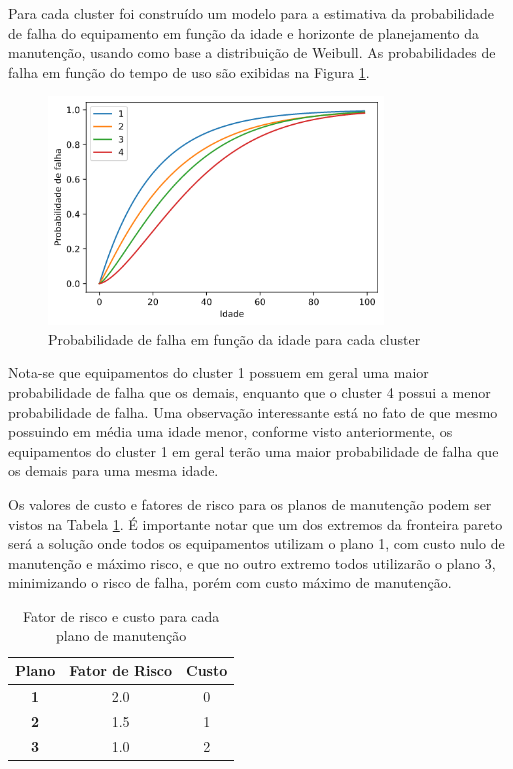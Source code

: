 \documentclass[conference]{IEEEtran}
\begin{document}
Para cada cluster foi construído um modelo para a estimativa da probabilidade de falha do equipamento em função da idade e horizonte de planejamento da manutenção, usando como base a distribuição de Weibull. As probabilidades de falha em função do tempo de uso são exibidas na Figura \ref{fig:figWeibull}.

\begin{figure}[h!]
	\centering
	\includegraphics[width=3.5in]{figWeibull.png}
	\caption{Probabilidade de falha em função da idade para cada cluster}
	\label{fig:figWeibull}
\end{figure}

Nota-se que equipamentos do cluster 1 possuem em geral uma maior probabilidade de falha que os demais, enquanto que o cluster 4 possui a menor probabilidade de falha. Uma observação interessante está no fato de que mesmo possuindo em média uma idade menor, conforme visto anteriormente, os equipamentos do cluster 1 em geral terão uma maior probabilidade de falha que os demais para uma mesma idade. 

Os valores de custo e fatores de risco para os planos de manutenção podem ser vistos na Tabela \ref{tb:mpdb}. É importante notar que um dos extremos da fronteira pareto será a solução onde todos os equipamentos utilizam o plano 1, com custo nulo de manutenção e máximo risco, e que no outro extremo todos utilizarão o plano 3, minimizando o risco de falha, porém com custo máximo de manutenção.

\begin{table}[h!]
	\caption{Fator de risco e custo para cada plano de manutenção}
	\label{tb:mpdb}
	\centering
	\begin{tabular}{|c|c|c|}
		\hline
		\textbf{Plano} & \textbf{Fator de Risco} & \textbf{Custo} \\ \hline
		\textbf{1}     & 2.0                     & 0              \\ \hline
		\textbf{2}     & 1.5                     & 1              \\ \hline
		\textbf{3}     & 1.0                     & 2              \\ \hline
	\end{tabular}
\end{table}
\end{document}
